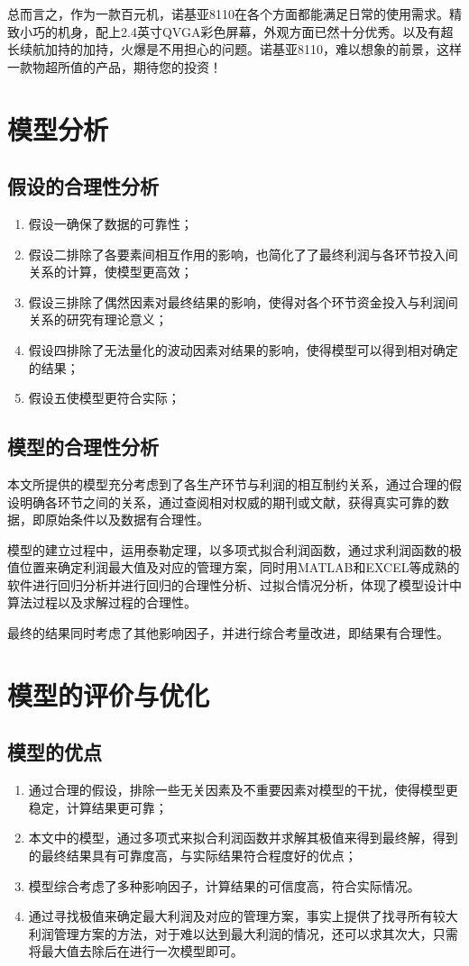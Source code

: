 \documentclass[12pt]{article}%
\begin{document}
总而言之，作为一款百元机，诺基亚8110在各个方面都能满足日常的使用需求。精致小巧的机身，配上2.4英寸QVGA彩色屏幕，外观方面已然十分优秀。以及有超长续航加持的加持，火爆是不用担心的问题。诺基亚8110，难以想象的前景，这样一款物超所值的产品，期待您的投资！
\newpage
\section{模型分析}
\subsection{假设的合理性分析}
\begin{enumerate}[1.]\addtolength{\itemsep}{-1.5ex}
\item 假设一确保了数据的可靠性；
\item 假设二排除了各要素间相互作用的影响，也简化了了最终利润与各环节投入间关系的计算，使模型更高效；
\item 假设三排除了偶然因素对最终结果的影响，使得对各个环节资金投入与利润间关系的研究有理论意义；
\item 假设四排除了无法量化的波动因素对结果的影响，使得模型可以得到相对确定的结果；
\item 假设五使模型更符合实际；
\end{enumerate}
\subsection{模型的合理性分析}
本文所提供的模型充分考虑到了各生产环节与利润的相互制约关系，通过合理的假设明确各环节之间的关系，通过查阅相对权威的期刊或文献，获得真实可靠的数据，即原始条件以及数据有合理性。

模型的建立过程中，运用泰勒定理，以多项式拟合利润函数，通过求利润函数的极值位置来确定利润最大值及对应的管理方案，同时用MATLAB和EXCEL等成熟的软件进行回归分析并进行回归的合理性分析、过拟合情况分析，体现了模型设计中算法过程以及求解过程的合理性。

最终的结果同时考虑了其他影响因子，并进行综合考量改进，即结果有合理性。
\section{模型的评价与优化}
\subsection{模型的优点}
\begin{enumerate}[1.]\addtolength{\itemsep}{-1.5ex}
\item 通过合理的假设，排除一些无关因素及不重要因素对模型的干扰，使得模型更稳定，计算结果更可靠；
\item 本文中的模型，通过多项式来拟合利润函数并求解其极值来得到最终解，得到的最终结果具有可靠度高，与实际结果符合程度好的优点；
\item 模型综合考虑了多种影响因子，计算结果的可信度高，符合实际情况。
\item 通过寻找极值来确定最大利润及对应的管理方案，事实上提供了找寻所有较大利润管理方案的方法，对于难以达到最大利润的情况，还可以求其次大，只需将最大值去除后在进行一次模型即可。
\end{enumerate}
\end{document}
